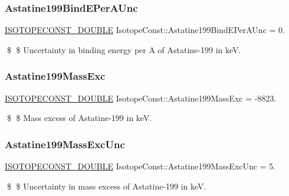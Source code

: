 \subsubsection{\texorpdfstring{Astatine199\+Bind\+E\+Per\+A\+Unc}{Astatine199BindEPerAUnc}}
{\footnotesize\ttfamily \mbox{\hyperlink{group___isotope_const-_macros_ga8f45a7272ce02c0b4c65c44636ed719a}{I\+S\+O\+T\+O\+P\+E\+C\+O\+N\+S\+T\+\_\+\+D\+O\+U\+B\+LE}} Isotope\+Const\+::\+Astatine199\+Bind\+E\+Per\+A\+Unc = 0.}

\$ \$ Uncertainty in binding energy per A of Astatine-\/199 in keV. \mbox{\label{group___isotope_const-_astatine-_at199_ga3f4f0d72072ae72f6da266e44a513560}} 
\subsubsection{\texorpdfstring{Astatine199\+Mass\+Exc}{Astatine199MassExc}}
{\footnotesize\ttfamily \mbox{\hyperlink{group___isotope_const-_macros_ga8f45a7272ce02c0b4c65c44636ed719a}{I\+S\+O\+T\+O\+P\+E\+C\+O\+N\+S\+T\+\_\+\+D\+O\+U\+B\+LE}} Isotope\+Const\+::\+Astatine199\+Mass\+Exc = -\/8823.}

\$ \$ Mass excess of Astatine-\/199 in keV. \mbox{\label{group___isotope_const-_astatine-_at199_ga4ffb4aac85ef748476fb3552924dc3b4}} 
\subsubsection{\texorpdfstring{Astatine199\+Mass\+Exc\+Unc}{Astatine199MassExcUnc}}
{\footnotesize\ttfamily \mbox{\hyperlink{group___isotope_const-_macros_ga8f45a7272ce02c0b4c65c44636ed719a}{I\+S\+O\+T\+O\+P\+E\+C\+O\+N\+S\+T\+\_\+\+D\+O\+U\+B\+LE}} Isotope\+Const\+::\+Astatine199\+Mass\+Exc\+Unc = 5.}

\$ \$ Uncertainty in mass excess of Astatine-\/199 in keV. \mbox{\label{group___isotope_const-_astatine-_at199_gaca10f00d3fe7acd7c3adc2a3fc286d55}} 
